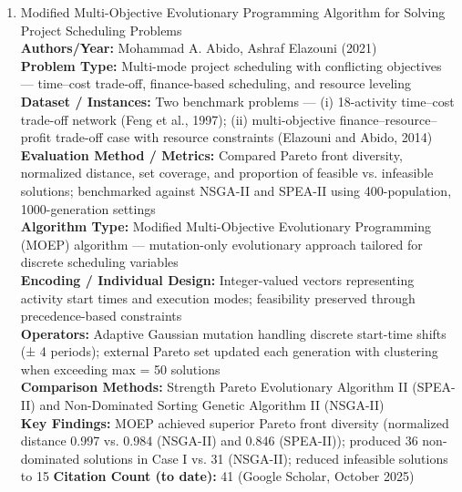 \documentclass[a4paper,12pt]{article}
\begin{document}
\begin{enumerate}[leftmargin=2em, labelwidth=1em, labelsep=0.5em, itemsep=1ex]
  \item Modified Multi-Objective Evolutionary Programming Algorithm for Solving Project Scheduling Problems \\
    \textbf{Authors/Year:} Mohammad A. Abido, Ashraf Elazouni (2021) \\
    \textbf{Problem Type:} Multi-mode project scheduling with conflicting objectives — time–cost trade-off, finance-based scheduling, and resource leveling \\
    \textbf{Dataset / Instances:} Two benchmark problems — (i) 18-activity time–cost trade-off network (Feng et al., 1997); (ii) multi-objective finance–resource–profit trade-off case with resource constraints (Elazouni and Abido, 2014) \\
    \textbf{Evaluation Method / Metrics:} Compared Pareto front diversity, normalized distance, set coverage, and proportion of feasible vs. infeasible solutions; benchmarked against NSGA-II and SPEA-II using 400-population, 1000-generation settings \\
    \textbf{Algorithm Type:} Modified Multi-Objective Evolutionary Programming (MOEP) algorithm — mutation-only evolutionary approach tailored for discrete scheduling variables \\
    \textbf{Encoding / Individual Design:} Integer-valued vectors representing activity start times and execution modes; feasibility preserved through precedence-based constraints \\
    \textbf{Operators:} Adaptive Gaussian mutation handling discrete start-time shifts (± 4 periods); external Pareto set updated each generation with clustering when exceeding max = 50 solutions \\
    \textbf{Comparison Methods:} Strength Pareto Evolutionary Algorithm II (SPEA-II) and Non-Dominated Sorting Genetic Algorithm II (NSGA-II) \\
    \textbf{Key Findings:} MOEP achieved superior Pareto front diversity (normalized distance 0.997 vs. 0.984 (NSGA-II) and 0.846 (SPEA-II)); produced 36 non-dominated solutions in Case I vs. 31 (NSGA-II); reduced infeasible solutions to 15 %
    \textbf{Citation Count (to date):} 41 (Google Scholar, October 2025) \\[2ex]
  


\end{enumerate}
\end{document}
